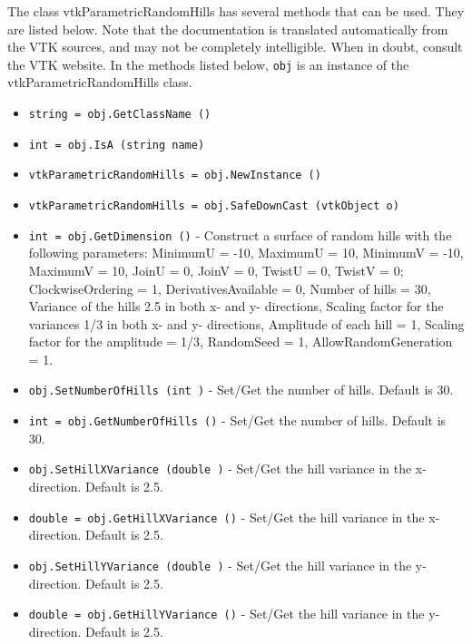 The class vtkParametricRandomHills has several methods that can be used.
  They are listed below.
Note that the documentation is translated automatically from the VTK sources,
and may not be completely intelligible.  When in doubt, consult the VTK website.
In the methods listed below, \verb|obj| is an instance of the vtkParametricRandomHills class.
\begin{itemize}
\item  \verb|string = obj.GetClassName ()|

\item  \verb|int = obj.IsA (string name)|

\item  \verb|vtkParametricRandomHills = obj.NewInstance ()|

\item  \verb|vtkParametricRandomHills = obj.SafeDownCast (vtkObject o)|

\item  \verb|int = obj.GetDimension ()| -  Construct a surface of random hills with the following parameters:
 MinimumU = -10, MaximumU = 10,
 MinimumV = -10, MaximumV = 10, 
 JoinU = 0, JoinV = 0,
 TwistU = 0, TwistV = 0;
 ClockwiseOrdering = 1, 
 DerivativesAvailable = 0,
 Number of hills = 30, 
 Variance of the hills 2.5 in both x- and y- directions, 
 Scaling factor for the variances 1/3 in both x- and y- directions, 
 Amplitude of each hill = 1, 
 Scaling factor for the amplitude = 1/3, 
 RandomSeed = 1,
 AllowRandomGeneration = 1.

\item  \verb|obj.SetNumberOfHills (int )| -  Set/Get the number of hills.
 Default is 30.

\item  \verb|int = obj.GetNumberOfHills ()| -  Set/Get the number of hills.
 Default is 30.

\item  \verb|obj.SetHillXVariance (double )| -  Set/Get the hill variance in the x-direction.
 Default is 2.5.

\item  \verb|double = obj.GetHillXVariance ()| -  Set/Get the hill variance in the x-direction.
 Default is 2.5.

\item  \verb|obj.SetHillYVariance (double )| -  Set/Get the hill variance in the y-direction.
 Default is 2.5.

\item  \verb|double = obj.GetHillYVariance ()| -  Set/Get the hill variance in the y-direction.
 Default is 2.5.


\end{itemize}

